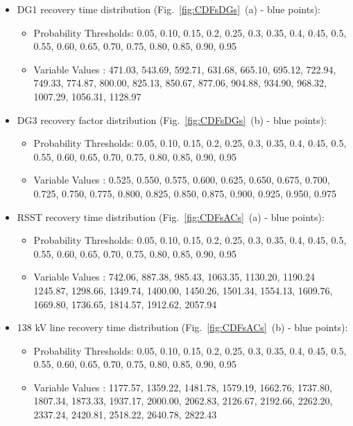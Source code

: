    \begin{itemize}
       \item DG1 recovery time distribution (Fig.~\ref{fig:CDFsDGs}~(a) - blue points): 
       \begin{itemize} 
            \item Probability Thresholds: 0.05, 0.10, 0.15, 0.2, 0.25, 0.3, 0.35, 0.4, 0.45, 0.5, 0.55, 0.60, 0.65, 0.70, 0.75, 0.80, 0.85, 0.90, 0.95
            \item Variable Values           : 471.03, 543.69, 592.71, 631.68, 665.10, 695.12, 722.94, 749.33, 774.87, 800.00, 825.13, 850.67, 877.06, 904.88, 934.90, 968.32, 1007.29, 1056.31, 1128.97
       \end{itemize}
       \item DG3 recovery factor distribution (Fig.~\ref{fig:CDFsDGs}~(b) - blue points): 
       \begin{itemize} 
            \item Probability Thresholds: 0.05, 0.10, 0.15, 0.2, 0.25, 0.3, 0.35, 0.4, 0.45, 0.5, 0.55, 0.60, 0.65, 0.70, 0.75, 0.80, 0.85, 0.90, 0.95
            \item Variable Values           : 0.525, 0.550, 0.575, 0.600, 0.625, 0.650, 0.675, 0.700, 0.725, 0.750, 0.775, 0.800, 0.825, 0.850, 0.875, 0.900, 0.925, 0.950, 0.975
       \end{itemize}
       \item RSST recovery time distribution (Fig.~\ref{fig:CDFsACs}~(a) - blue points): 
       \begin{itemize} 
            \item Probability Thresholds: 0.05, 0.10, 0.15, 0.2, 0.25, 0.3, 0.35, 0.4, 0.45, 0.5, 0.55, 0.60, 0.65, 0.70, 0.75, 0.80, 0.85, 0.90, 0.95
            \item Variable Values           : 742.06, 887.38, 985.43, 1063.35, 1130.20, 1190.24	1245.87, 1298.66, 1349.74, 1400.00, 1450.26, 1501.34, 1554.13, 1609.76, 1669.80, 1736.65, 1814.57, 1912.62, 2057.94
       \end{itemize}
       \item 138 kV line recovery time distribution (Fig.~\ref{fig:CDFsACs}~(b) - blue points): 
       \begin{itemize} 
            \item Probability Thresholds: 0.05, 0.10, 0.15, 0.2, 0.25, 0.3, 0.35, 0.4, 0.45, 0.5, 0.55, 0.60, 0.65, 0.70, 0.75, 0.80, 0.85, 0.90, 0.95
            \item Variable Values           : 1177.57, 1359.22, 1481.78, 1579.19, 1662.76, 1737.80, 1807.34, 1873.33, 1937.17, 2000.00, 2062.83, 2126.67, 	2192.66, 2262.20, 2337.24, 2420.81, 2518.22, 2640.78, 2822.43

\end{itemize}
\end{itemize}

